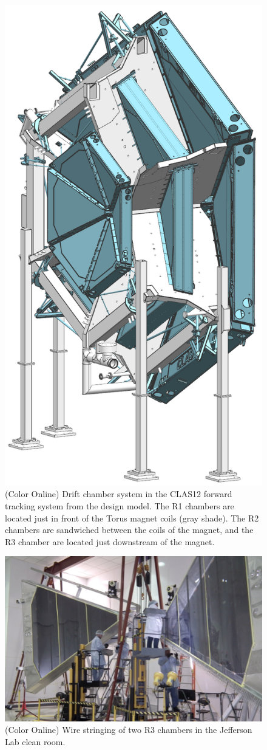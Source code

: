 \documentclass[final,3p,twocolumn]{elsarticle}
\begin{document}
\begin{figure}[htbp!]
\centerline{\includegraphics[width=0.65\columnwidth]{dc-view-4.png}}
\caption{(Color Online) Drift chamber system in the CLAS12 forward tracking system from the design model. The R1 chambers
are located just in front of the Torus magnet coils (gray shade). The R2 chambers are sandwiched between the coils 
of the magnet, and the R3 chamber are located just downstream of the magnet.}
\label{clas12-dc}
\end{figure}

\begin{figure}[htbp!]
\centerline{\includegraphics[width=1.95\columnwidth]{DC-R3.png}}
\caption{(Color Online) Wire stringing of two R3 chambers in the Jefferson Lab clean room.}
\label{dc-stringing}
\end{figure}
\end{document}
